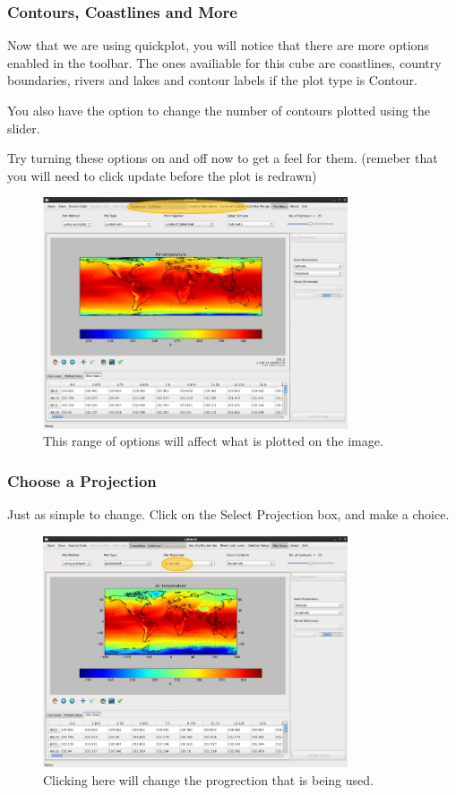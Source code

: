 \documentclass[a4paper,12pt]{article}
\begin{document}
\subsubsection{Contours, Coastlines and More}

Now that we are using quickplot, you will notice that there are more options
enabled in the toolbar. The ones
availiable for this cube are coastlines, country boundaries, rivers and lakes
and contour labels if the plot type is Contour.

You also have the option to change the number of contours plotted using the
slider.

Try turning these options on and off now to get a feel for them.
(remeber that you will need to click update before the plot is redrawn)

\begin{figure}[H]
\centering
\includegraphics[width=90mm]{resources/tute9.PNG}
\caption{This range of options will affect what is plotted on the image.}
\label{overflow}
\end{figure}


\subsubsection{Choose a Projection}

Just as simple to change. Click on the Select Projection box, and make a choice.

\begin{figure}[H]
\centering
\includegraphics[width=90mm]{resources/tute8.PNG}
\caption{Clicking here will change the progrection that is being used.}
\label{overflow}
\end{figure}
\end{document}
